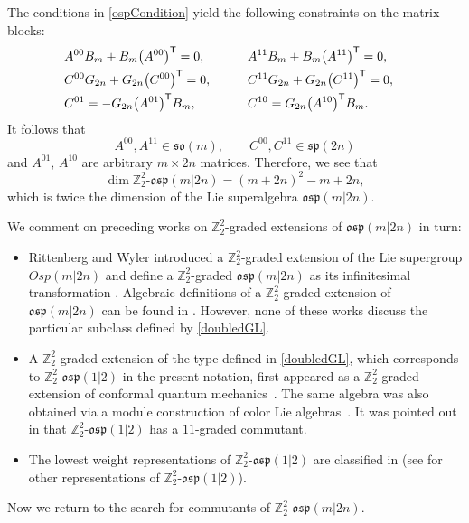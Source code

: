 \documentclass[pdftex]{sigma}
\numberwithin{equation}{section}
\theoremstyle{definition}
\def\Z2{\mathbb{Z}_2^2}
\def\osp{\mathfrak{osp}}
\def\so{\mathfrak{so}}
\def\sp{\mathfrak{sp}}
\def\Zosp{$\Z2$-$\osp(m|2n)$}
\begin{document}
The conditions in \eqref{ospCondition} yield the following constraints on the matrix blocks:
\begin{alignat}{3}
	&A^{00} B_m+ B_m \bigl(A^{00}\bigr)^{\mathsf{T}} = 0, \qquad && A^{11} B_m+ B_m \bigl(A^{11}\bigr)^{\mathsf{T}} = 0,&
	\notag\\
&	C^{00}G_{2n}+ G_{2n}\bigl(C^{00}\bigr)^{\mathsf{T}} = 0,\qquad&& C^{11} G_{2n}+ G_{2n}\bigl(C^{11}\bigr)^{\mathsf{T}} = 0,&
	\notag \\
&	C^{01}= -G_{2n}\bigl(A^{01}\bigr)^{\mathsf{T}} B_m, \qquad && C^{10}= G_{2n}\bigl(A^{10}\bigr)^{\mathsf{T}} B_m.&
	\label{StrOfX}
\end{alignat}
It follows that
\begin{equation*}
	A^{00}, A^{11} \in \so(m), \qquad C^{00}, C^{11} \in \sp(2n)
\end{equation*}
and $ A^{01}$, $A^{10}$ are arbitrary $ m \times 2n$ matrices.
Therefore, we see that
\[
\dim \Z2\text{-}\osp(m|2n) = (m+2n)^2-m+2n,
\]
which is twice the dimension of the Lie superalgebra $\osp(m|2n)$.

We comment on preceding works on $\Z2$-graded extensions of $\osp(m|2n)$ in turn:
\begin{itemize}\itemsep=0pt
	\item[(1)] Rittenberg and Wyler introduced a $\Z2$-graded extension of the Lie supergroup $Osp(m|2n)$ and define a $\Z2$-graded $\osp(m|2n)$ as its infinitesimal transformation \cite{rw2}.
	Algebraic definitions of a $\Z2$-graded extension of $\osp(m|2n)$ can be found in \cite{GrJav, JaYangWyb,SVdJ2018,SVdJ2024}.
	However, none of these works discuss the particular subclass defined by \eqref{doubledGL}.
	\item[(2)] A $\Z2$-graded extension of the type defined in \eqref{doubledGL}, which corresponds to $\Z2$-$\osp(1|2)$ in the present notation, first appeared as a $\Z2$-graded extension of conformal quantum mechanics~\cite{Aizawa_2020}.
	The same algebra was also obtained via a module construction of color Lie algebras~\cite{LU20231}.
	It was pointed out in \cite{AiSe} that $\Z2$-$\osp(1|2)$ has a $11$-graded commutant.
	\item[(3)] The lowest weight representations of $\Z2$-$\osp(1|2)$ are classified in \cite{AmaAi} (see \cite{AlHoSe} for other representations of $\Z2$-$\osp(1|2)$).
\end{itemize}

Now we return to the search for commutants of \Zosp.
\end{document}
